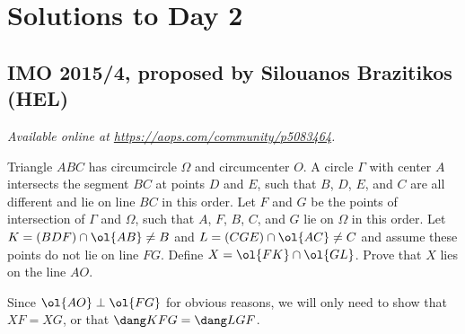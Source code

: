 \documentclass[11pt]{scrartcl}
\begin{document}
\section{Solutions to Day 2}
\subsection{IMO 2015/4, proposed by Silouanos Brazitikos (HEL)}
\textsl{Available online at \url{https://aops.com/community/p5083464}.}
\begin{mdframed}[style=mdpurplebox,frametitle={Problem statement}]
Triangle $ABC$ has circumcircle $\Omega$ and circumcenter $O$.
A circle $\Gamma$ with center $A$
intersects the segment $BC$ at points $D$ and $E$,
such that $B$, $D$, $E$, and $C$ are all different
and lie on line $BC$ in this order.
Let $F$ and $G$ be the points of intersection of $\Gamma$ and $\Omega$,
such that $A$, $F$, $B$, $C$, and $G$ lie on $\Omega$ in this order.
Let $K = (BDF) \cap \ol{AB} \neq B$
and $L = (CGE) \cap \ol{AC} \neq C$
and assume these points do not lie on line $FG$.
Define $X = \ol{FK} \cap \ol{GL}$.
Prove that $X$ lies on the line $AO$.
\end{mdframed}
Since $\ol{AO} \perp \ol{FG}$ for obvious reasons,
we will only need to show that $XF = XG$,
or that $\dang KFG = \dang LGF$.
\end{document}
